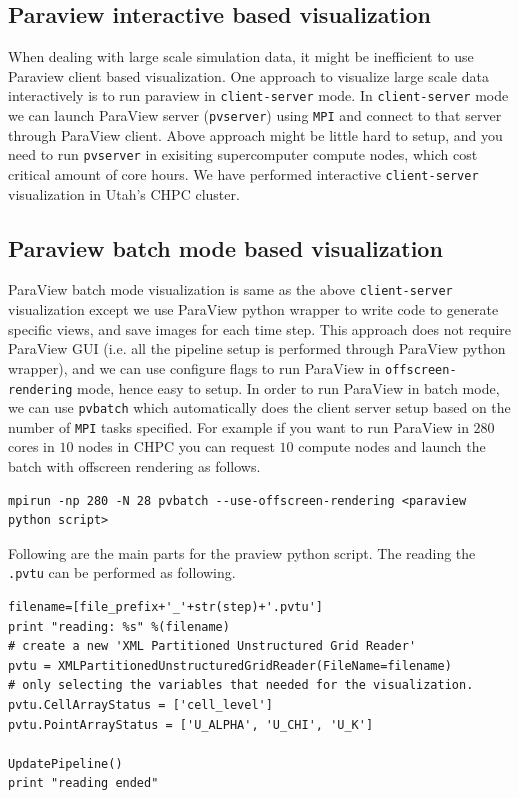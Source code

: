 \subsection{Paraview interactive based visualization}
When dealing with large scale simulation data, it might be inefficient to use Paraview client based visualization. One approach to visualize large scale data interactively is to run paraview in \texttt{client-server} mode. 
In \texttt{client-server} mode we can launch ParaView server (\texttt{pvserver}) using \texttt{MPI} and connect to that server through ParaView client. Above approach might be little hard to setup, and you need to run \texttt{pvserver} in 
exisiting supercomputer compute nodes, which cost critical amount of core hours. We have performed interactive \texttt{client-server} visualization in Utah's CHPC cluster. 

\subsection{Paraview batch mode based visualization}
ParaView batch mode visualization is same as the above \texttt{client-server} visualization except we use ParaView python wrapper to write code to generate specific views, and save images for each time step. This approach does not require 
ParaView GUI (i.e. all the pipeline setup is performed through ParaView python wrapper), and we can use configure flags to run ParaView in \texttt{offscreen-rendering} mode, hence easy to setup. In order to run ParaView in batch mode, 
we can use \texttt{pvbatch} which automatically does the client server setup based on the number of \texttt{MPI} tasks specified. For example if you want to run ParaView in $280$ cores in $10$ nodes in CHPC you can request $10$
compute nodes and launch the batch with offscreen rendering as follows. 

\begin{lstlisting}[basicstyle=\small]
mpirun -np 280 -N 28 pvbatch --use-offscreen-rendering <paraview python script>
\end{lstlisting}

Following are the main parts for the praview python script. The reading the \texttt{.pvtu} can be performed as following. 

\begin{lstlisting}[basicstyle=\small]
filename=[file_prefix+'_'+str(step)+'.pvtu']
print "reading: %s" %(filename)
# create a new 'XML Partitioned Unstructured Grid Reader'
pvtu = XMLPartitionedUnstructuredGridReader(FileName=filename)
# only selecting the variables that needed for the visualization.
pvtu.CellArrayStatus = ['cell_level'] 
pvtu.PointArrayStatus = ['U_ALPHA', 'U_CHI', 'U_K']

UpdatePipeline()
print "reading ended"
\end{lstlisting}

